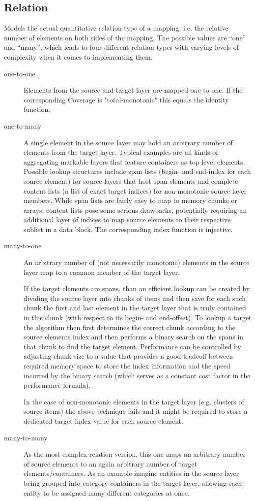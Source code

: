\documentclass[11pt,a4paper]{report}
\begin{document}
\subsection{Relation}
Models the actual quantitative relation type of a mapping, i.e. the relative number of elements on both sides of the mapping. The possible values are ``one'' and ``many'', which leads to four different relation types with varying levels of complexity when it comes to implementing them.
\label{sec:enum-relation}
\begin{description}
	\item[one-to-one] Elements from the source and target layer are mapped one to one. If the corresponding Coverage is "total-monotonic" this equals the identity function.
	\item[one-to-many] A single element in the source layer may hold an arbitrary number of elements from the target layer. Typical examples are all kinds of aggregating markable layers that feature containers as top level elements. Possible lookup structures include span lists (begin- and end-index for each source element) for source layers that host span elements and complete content lists (a list of exact target indices) for non-monotonic source layer members. While span lists are fairly easy to map to memory chunks or arrays, content lists pose some serious drawbacks, potentially requiring an additional layer of indices to map source elements to their respective sublist in a data block. The corresponding index function is injective.
	\item[many-to-one] An arbitrary number of (not necessarily monotonic) elements in the source layer map to a common member of the target layer.
	
	If the target elements are spans, than an efficient lookup can be created by dividing the source layer into chunks of items and then save for each such chunk the first and last element in the target layer that is truly contained in this chunk (with respect to its begin- and end-offset). To lookup a target the algorithm then first determines the correct chunk according to the source elements index and then performs a binary search on the spans in that chunk to find the target element. Performance can be controlled by adjusting chunk size to a value that provides a good tradeoff between required memory space to store the index information and the speed incurred by the binary search (which serves as a constant cost factor in the performance formula).
	
	In the case of non-monotonic elements in the target layer (e.g. clusters of source items) the above technique fails and it might be required to store a dedicated target index value for each source element.
	\item[many-to-many] As the most complex relation version, this one maps an arbitrary number of source elements to an again arbitrary number of target elements/containers. As an example imagine entities in the source layer being grouped into category containers in the target layer, allowing each entity to be assigned many different categories at once.
	

\end{description}
\end{document}
